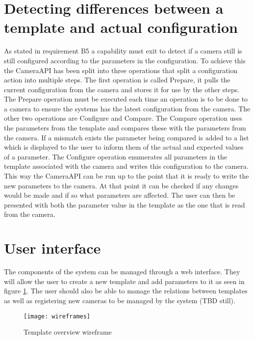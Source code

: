 \section{Detecting differences between a template and actual configuration}
As stated in requirement B5 a capability must exit to detect if a camera still is still configured according to the parameters in the configuration.
To achieve this the CameraAPI has been split into three operations that split a configuration action into multiple steps.
The first operation is called Prepare, it pulls the current configuration from the camera and stores it for use by the other steps.
The Prepare operation must be executed each time an operation is to be done to a camera to ensure the systems has the latest configuration from the camera.
The other two operations are Configure and Compare.
The Compare operation uses the parameters from the template and compares these with the parameters from the camera.
If a mismatch exists the parameter being compared is added to a list which is displayed to the user to inform them of the actual and expected values of a parameter.
The Configure operation enumerates all parameters in the template associated with the camera and writes this configuration to the camera.
This way the CameraAPI can be run up to the point that it is ready to write the new parameters to the camera.
At that point it can be checked if any changes would be made and if so what parameters are affected.
The user can then be presented with both the parameter value in the template as the one that is read from the camera.

\section{User interface}
The components of the system can be managed through a web interface.
They will allow the user to create a new template and add parameters to it as seen in figure \ref{fig:templatewireframe}.
The user should also be able to manage the relations between templates as well as registering new cameras to be managed by the system (TBD still).
\begin{figure}[h!]
	\centering
	\texttt{[image: wireframes]}
	\caption{Template overview  wireframe}
	\label{fig:templatewireframe}
\end{figure}
